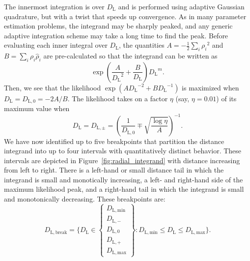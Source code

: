 \documentclass{iopart}
\begin{document}
The innermost integration is over $D_\mathrm{L}$ and is performed using adaptive Gaussian quadrature, but with a twist that speeds up convergence. As in many parameter estimation problems, the integrand may be sharply peaked, and any generic adaptive integration scheme may take a long time to find the peak. Before evaluating each inner integral over $D_\mathrm{L}$, the quantities $A=-\frac{1}{2} \sum_i {\rho_i}^2$ and $B=\sum_i \rho_i \hat\rho_i$ are pre\nobreakdashes-calculated so that the integrand can be written as
%
\begin{equation*}
	\exp\left(\frac{A}{{D_\mathrm{L}}^2} + \frac{B}{D_\mathrm{L}}\right) {D_\mathrm{L}}^m.
\end{equation*}
%
Then, we see that the likelihood $\exp(A {D_\mathrm{L}}^{-2} + B {D_\mathrm{L}}^{-1})$ is maximized when $D_\mathrm{L} = D_{\mathrm{L},0} = -2A/B$. The likelihood takes on a factor $\eta$ (say, $\eta=0.01$) of its maximum value when
%
\begin{equation}
	D_\mathrm{L} = D_{\mathrm{L},\pm} = \left(\frac{1}{D_{\mathrm{L},0}} \mp \sqrt{\frac{\log\eta}{A}}\right)^{-1}.
\end{equation}
%
We have now identified up to five breakpoints that partition the distance integrand into up to four intervals with quantitatively distinct behavior. These intervals are depicted in Figure~\ref{fig:radial_integrand} with distance increasing from left to right. There is a left\nobreakdashes-hand or small distance tail in which the integrand is small and monotically increasing, a left\nobreakdashes- and right\nobreakdashes-hand side of the maximum likelihood peak, and a right\nobreakdashes-hand tail in which the integrand is small and monotonically decreasing. These breakpoints are:
%
\begin{equation}
    D_{\mathrm{L},\mathrm{break}} = \{ D_\mathrm{L} \in
    \left\{
    \begin{array}{c}
    D_{\mathrm{L},\mathrm{min}} \\
    D_{\mathrm{L},-} \\
    D_{\mathrm{L},0} \\
    D_{\mathrm{L},+} \\
    D_{\mathrm{L},\mathrm{max}}
    \end{array}
    \right\} :
    D_{\mathrm{L},\mathrm{min}} \leq D_\mathrm{L}
    \leq D_{\mathrm{L},\mathrm{max}}\}.
\end{equation}
%
\end{document}

